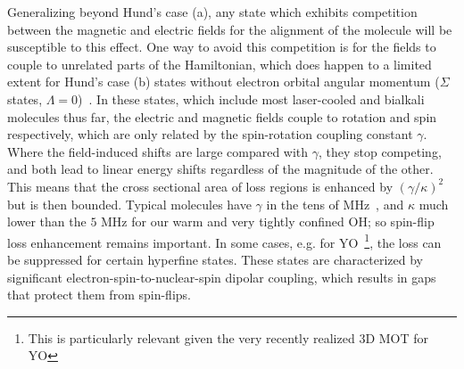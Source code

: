 \documentclass[%
 reprint,
 amsmath,amssymb,
 aps,
prl,
]{revtex4-1}
\begin{document}
Generalizing beyond Hund's case (a), any state which exhibits competition between the magnetic and electric fields for the alignment of the molecule will be susceptible to this effect. 
One way to avoid this competition is for the fields to couple to unrelated parts of the Hamiltonian, which does happen to a limited extent for Hund's case (b) states without electron orbital angular momentum ($\Sigma$ states, $\Lambda=0$)~\cite{Bohn2013}. 
In these states, which include most laser-cooled and bialkali molecules thus far, the electric and magnetic fields couple to rotation and spin respectively, which are only related by the spin-rotation coupling constant $\gamma$. 
Where the field-induced shifts are large compared with $\gamma$, they stop competing, and both lead to linear energy shifts regardless of the magnitude of the other. 
This means that the cross sectional area of loss regions is enhanced by $(\gamma/\kappa)^2$ but is then bounded. 
Typical molecules have $\gamma$ in the tens of MHz~\cite{Quemener2016}, and $\kappa$ much lower than the $5\text{ MHz}$ for our warm and very tightly confined OH; so spin-flip loss enhancement remains important. 
In some cases, e.g. for YO~\footnote{This is particularly relevant given the very recently realized 3D MOT for YO}, the loss can be suppressed for certain hyperfine states. 
These states are characterized by significant  electron-spin-to-nuclear-spin dipolar coupling, which results in gaps that protect them from spin-flips.


\end{document}
